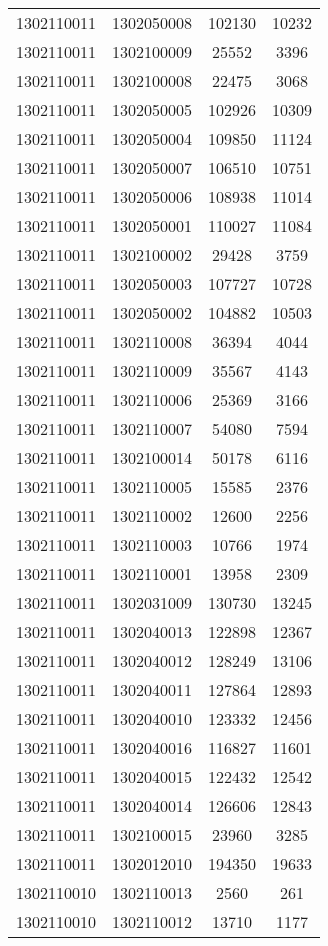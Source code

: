 \begin{longtable}{llcc}
1302110011 & 1302050008 & 102130 & 10232\\
1302110011 & 1302100009 & 25552 & 3396\\
1302110011 & 1302100008 & 22475 & 3068\\
1302110011 & 1302050005 & 102926 & 10309\\
1302110011 & 1302050004 & 109850 & 11124\\
1302110011 & 1302050007 & 106510 & 10751\\
1302110011 & 1302050006 & 108938 & 11014\\
1302110011 & 1302050001 & 110027 & 11084\\
1302110011 & 1302100002 & 29428 & 3759\\
1302110011 & 1302050003 & 107727 & 10728\\
1302110011 & 1302050002 & 104882 & 10503\\
1302110011 & 1302110008 & 36394 & 4044\\
1302110011 & 1302110009 & 35567 & 4143\\
1302110011 & 1302110006 & 25369 & 3166\\
1302110011 & 1302110007 & 54080 & 7594\\
1302110011 & 1302100014 & 50178 & 6116\\
1302110011 & 1302110005 & 15585 & 2376\\
1302110011 & 1302110002 & 12600 & 2256\\
1302110011 & 1302110003 & 10766 & 1974\\
1302110011 & 1302110001 & 13958 & 2309\\
1302110011 & 1302031009 & 130730 & 13245\\
1302110011 & 1302040013 & 122898 & 12367\\
1302110011 & 1302040012 & 128249 & 13106\\
1302110011 & 1302040011 & 127864 & 12893\\
1302110011 & 1302040010 & 123332 & 12456\\
1302110011 & 1302040016 & 116827 & 11601\\
1302110011 & 1302040015 & 122432 & 12542\\
1302110011 & 1302040014 & 126606 & 12843\\
1302110011 & 1302100015 & 23960 & 3285\\
1302110011 & 1302012010 & 194350 & 19633\\
1302110010 & 1302110013 & 2560 & 261\\
1302110010 & 1302110012 & 13710 & 1177\\

\end{longtable}
